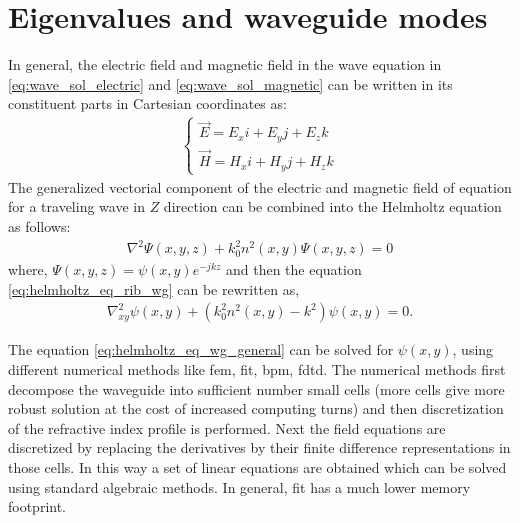 \documentclass[../report.tex]{subfiles}
\begin{document}
	\section{Eigenvalues and waveguide modes}
	In general, the electric field and magnetic field in the wave equation in \ref{eq:wave_sol_electric} and \ref{eq:wave_sol_magnetic} can be written in its constituent parts in Cartesian coordinates as:
	\begin{equation}\label{eq:em_field_cart_cord}
	\begin{aligned}
	\begin{cases}
	\vec{E}=E_{x}i+E_{y}j+E_{z}k\\
	\vec{H}=H_{x}i+H_{y}j+H_{z}k
	\end{cases}
	\end{aligned}
	\end{equation}
	The generalized vectorial component of the electric and magnetic field of equation for a traveling wave in $Z$ direction can be combined into the Helmholtz equation as follows:
	\begin{equation}\label{eq:helmholtz_eq_rib_wg}
	\begin{aligned}
	\nabla ^{2}\Psi \left( x,y,z\right) +k_{0}^{2}n^{2}\left(x,y\right) \Psi \left( x,y,z\right) = 0
	\end{aligned}
	\end{equation}
	where, $\Psi \left( x,y,z\right) = \psi \left( x,y\right)e^{-jkz} $ and then the equation \ref{eq:helmholtz_eq_rib_wg} can be rewritten as,
	\begin{equation}\label{eq:helmholtz_eq_wg_general}
	\begin{aligned}
	\nabla_{xy} ^{2}\psi \left( x,y\right) +\left(k_{0}^{2}n^{2}\left(x,y\right) - k^2\right)\psi \left( x,y\right) = 0.
	\end{aligned}
	\end{equation}
	
	\noindent The equation \ref{eq:helmholtz_eq_wg_general} can be solved for $\psi \left( x,y\right)$, using different numerical methods like \gls{fem}, \gls{fit}, \gls{bpm}, \gls{fdtd}. The numerical methods first decompose the waveguide into sufficient number small cells (more cells give more robust solution at the cost of increased computing turns) and then discretization of the refractive index profile is performed. Next the field equations are discretized by replacing the derivatives by their finite difference representations in those cells. In this way a set of linear equations are obtained which can be solved using standard algebraic methods. In general, \gls{fit} has a much lower memory footprint.\par
	
\end{document}
